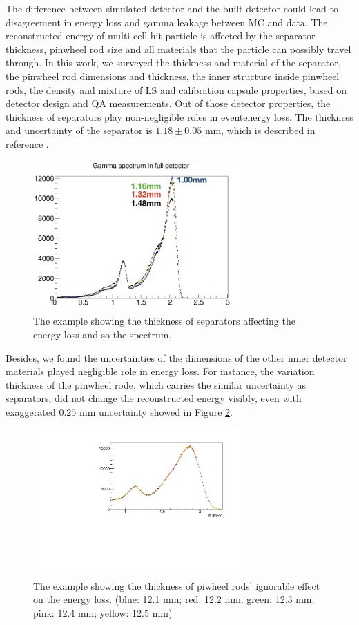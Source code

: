 The difference between simulated detector and the built detector could lead to disagreement in energy loss and gamma leakage between MC and data. 
The reconstructed energy of multi-cell-hit particle is affected by the separator thickness, pinwheel rod size and all materials that the particle can possibly travel through. 
In this work, we surveyed the thickness and material of the separator, the pinwheel rod dimensions and thickness, the inner structure inside pinwheel rods, the density and mixture of LS and calibration capsule properties, based on detector design and QA measurements.
Out of those detector properties, the thickness of separators play non-negligible roles in eventenergy loss. 
The thickness and uncertainty of the separator is $1.18 \pm 0.05$ mm, which is described in reference \cite{docThick}.

\begin{figure}[h!]
\centering
\includegraphics[width=80mm]{Figures/thickness.png}
\caption{The example showing the thickness of separators affecting the energy loss and so the spectrum.}
\label{fig:thickness}
\end{figure}

Besides, we found the uncertainties of the dimensions of the other inner detector materials played negligible role in energy loss. 
For instance, the variation thickness of the pinwheel rode, which carries the similar uncertainty as separators, did not change the reconstructed energy visibly, even with exaggerated $0.25$ mm uncertainty showed in Figure \ref{fig:pinwheelthick}.

\begin{figure}[h!]
\centering
\includegraphics[width=80mm]{Figures/pinwheelthick.pdf}
\caption{The example showing the thickness of piwheel rods$^\prime$ ignorable effect on the energy loss. (blue: 12.1 mm; red: 12.2 mm; green: 12.3 mm; pink: 12.4 mm; yellow: 12.5 mm)}
\label{fig:pinwheelthick}
\end{figure}

